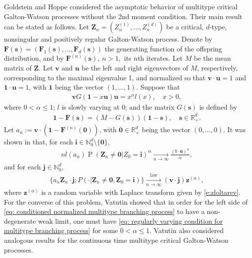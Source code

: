 	Goldstein and Hoppe \cite{GoldsteinHoppe1978Critical} considered the asymptotic behavior of multitype critical Galton-Watson processes without the 2nd moment
    condition. Their main result can be stated as follows.
	Let $\mathbf Z_n=(Z_n^{(1)}, \dots, Z_n^{(d)})$ be a critical, $d$-type, nonsingular and positively regular Galton-Watson process.
	Denote by $\mathbf F(\mathbf s) = (\mathbf F_1(\mathbf s), \dots, \mathbf F_d(\mathbf s))$ the generating function of the offspring distribution, and by $\mathbf F^{(n)}(\mathbf s), ~ n>1,$ its $n$th iterates.
	Let $M$ be the mean matrix of $\mathbf Z$. Let $\mathbf v$ and $\mathbf u$ be the left and right  eigenvectors of $M$, 
	respectively, corresponding to the maximal eigenvalue 1, and normalized so that $\mathbf v \cdot \mathbf u = 1$ and $\mathbf 1 \cdot \mathbf u = 1$, with $\mathbf 1$ being the vector $(1,\dots, 1)$.
	Suppose that
\begin{align}\label{eq: regularly varying condition for multitype branching process}
	\mathbf v G(\mathbf 1-x\mathbf u) \mathbf u
	= x^\alpha l(x),
	\quad x > 0,
\end{align}
	where $0 < \alpha \leq 1$; 
	$l$ is slowly varying at $0$;
	and the matrix $G(\mathbf s)$ is defined by
\begin{align}
	\mathbf 1 - \mathbf F(\mathbf s)
	= (M - G(\mathbf s))(\mathbf 1 - \mathbf s),
	\quad \mathbf s \in \mathbb R_+^d.
\end{align}
    Let $a_n := \mathbf v \cdot (\mathbf 1 - \mathbf F^{(n)}(\mathbf 0))$, with $\mathbf 0 \in \mathbb R_+^d$ being the vector $(0,\dots, 0)$.
	It was shown in \cite{GoldsteinHoppe1978Critical} that, for each $\mathbf i \in \mathbb N_0^d \setminus \{\mathbf 0\}$,
\begin{align} \label{eq: limit behavior of the exitinction probability without finite variance of multitype branching processes}
    n l(a_n)
	\operatorname{P}(\mathbf Z_n \neq \mathbf 0| Z_0 = \mathbf i)^\alpha
	\xrightarrow[n\to \infty]{}
	\frac{(\mathbf i \cdot \mathbf u)^\alpha}\alpha,
\end{align}
	and for each $\mathbf j \in \mathbb N_0^d$,
\begin{align}\label{eq: conditioned normalized multitype branching process}
	\{ a_n \mathbf Z_n \cdot \mathbf j ; P(\cdot | \mathbf Z_n \neq \mathbf 0, \mathbf Z_0 = \mathbf i)\}
	\xrightarrow[n\to \infty]{\operatorname{law}} (\mathbf v\cdot \mathbf j) \mathbf z^{(\alpha)},
\end{align}
	where $\mathbf z^{(\alpha)}$ is a random variable with Laplace transform given by \eqref{e:zloltarev}.
	For the converse of this problem, Vatutin \cite{Vatutin1977Limit} showed that in order for the left side of \eqref{eq: conditioned normalized multitype branching process} to have a non-degenerate weak limit, one must have \eqref{eq: regularly varying condition for multitype branching process} for some $0 < \alpha \leq 1$.
	Vatutin \cite{Vatutin1977Limit} also considered analogous results for the continuous time multitype critical Galton-Watson processes.
	
